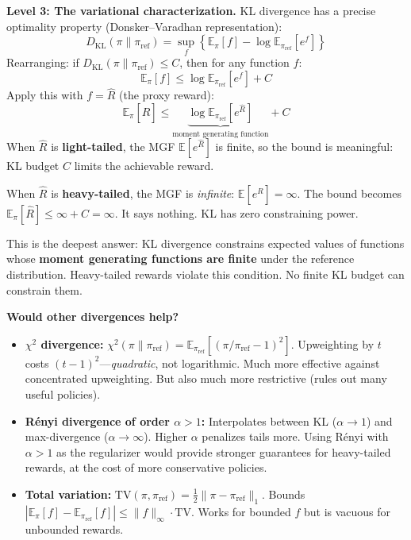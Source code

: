 \documentclass[11pt]{article}
\begin{document}
\textbf{Level 3: The variational characterization.} KL divergence has a
precise optimality property (Donsker--Varadhan representation):
\begin{equation}
  D_{\text{KL}}(\pi \| \pi_{\text{ref}}) =
  \sup_f \left\{
    \mathbb{E}_\pi[f] - \log \mathbb{E}_{\pi_{\text{ref}}}[e^f]
  \right\}
\end{equation}
Rearranging: if $D_{\text{KL}}(\pi \| \pi_{\text{ref}}) \leq C$, then
for any function $f$:
\begin{equation}
  \mathbb{E}_\pi[f] \leq \log \mathbb{E}_{\pi_{\text{ref}}}[e^f] + C
  \label{eq:dv-bound}
\end{equation}
Apply this with $f = \hat{R}$ (the proxy reward):
\begin{equation}
  \mathbb{E}_\pi[\hat{R}]
  \leq \underbrace{\log \mathbb{E}_{\pi_{\text{ref}}}[e^{\hat{R}}]}
    _{\text{moment generating function}} + C
\end{equation}
When $\hat{R}$ is \textbf{light-tailed}, the MGF
$\mathbb{E}[e^{\hat{R}}]$ is finite, so the bound is meaningful:
KL budget $C$ limits the achievable reward.

When $\hat{R}$ is \textbf{heavy-tailed}, the MGF is \emph{infinite}:
$\mathbb{E}[e^{\hat{R}}] = \infty$. The bound becomes
$\mathbb{E}_\pi[\hat{R}] \leq \infty + C = \infty$. It says nothing.
KL has zero constraining power.

This is the deepest answer: KL divergence constrains expected values of
functions whose \textbf{moment generating functions are finite} under
the reference distribution. Heavy-tailed rewards violate this condition.
No finite KL budget can constrain them.

\textbf{Would other divergences help?}
\begin{itemize}
  \item \textbf{$\chi^2$ divergence:}
    $\chi^2(\pi \| \pi_{\text{ref}}) =
    \mathbb{E}_{\pi_{\text{ref}}}[(\pi/\pi_{\text{ref}} - 1)^2]$.
    Upweighting by $t$ costs $(t-1)^2$---\emph{quadratic}, not
    logarithmic. Much more effective against concentrated upweighting.
    But also much more restrictive (rules out many useful policies).

  \item \textbf{R\'enyi divergence of order $\alpha > 1$:}
    Interpolates between KL ($\alpha \to 1$) and max-divergence
    ($\alpha \to \infty$). Higher $\alpha$ penalizes tails more.
    Using R\'enyi with $\alpha > 1$ as the regularizer would provide
    stronger guarantees for heavy-tailed rewards, at the cost of more
    conservative policies.

  \item \textbf{Total variation:} $\text{TV}(\pi, \pi_{\text{ref}}) =
    \frac{1}{2} \|\pi - \pi_{\text{ref}}\|_1$. Bounds
    $|\mathbb{E}_\pi[f] - \mathbb{E}_{\pi_{\text{ref}}}[f]| \leq
    \|f\|_\infty \cdot \text{TV}$. Works for bounded $f$ but is
    vacuous for unbounded rewards.
\end{itemize}
\end{document}
